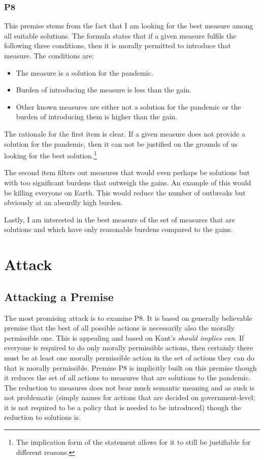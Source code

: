 \subsubsection*{P8}

This premise stems from the fact that I am looking for the best measure among all suitable solutions.
The formula states that if a given measure fulfils the following three conditions, then it is morally permitted to introduce that measure.
The conditions are:

\begin{itemize}[noitemsep]
\item The measure is a solution for the pandemic.
\item Burden of introducing the measure is less than the gain.
\item Other known measures are either not a solution for the pandemic or the burden of introducing them is higher than the gain.
\end{itemize}

The rationale for the first item is clear.
If a given measure does not provide a solution for the pandemic, then it can not be justified on the grounds of us looking for the best solution.\footnote{The implication form of the statement allows for it to still be justifiable for different reasons.}

The second item filters out measures that would even perhaps be solutions but with too significant burdens that outweigh the gains.
An example of this would be killing everyone on Earth.
This would reduce the number of outbreaks but obviously at an absurdly high burden.

Lastly, I am interested in the best measure of the set of measures that are solutions and which have only reasonable burdens compared to the gains.

\section{Attack}

\subsection{Attacking a Premise}

The most promising attack is to examine P8.
It is based on generally believable premise that the best of all possible actions is necessarily also the morally permissible one.
This is appealing and based on Kant's \emph{should implies can}.
If everyone is required to do only morally permissible actions, then certainly there must be at least one morally permissible action in the set of actions they can do that is morally permissible.
Premise P8 is implicitly built on this premise though it reduces the set of all actions to measures that are solutions to the pandemic.
The reduction to measures does not bear much semantic meaning and as such is not problematic (simply names for actions that are decided on government-level; it is not required to be a policy that is needed to be introduced) though the reduction to solutions is. 

